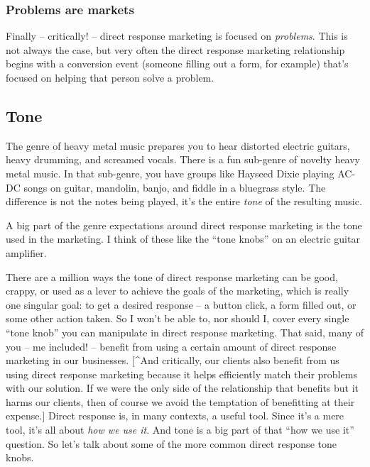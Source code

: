 \documentclass[13pt,]{tufte-handout}
\begin{document}
\hypertarget{problems-are-markets}{%
\subsubsection{Problems are markets}\label{problems-are-markets}}

Finally -- critically! -- direct response marketing is focused on
\emph{problems}. This is not always the case, but very often the direct
response marketing relationship begins with a conversion event (someone
filling out a form, for example) that's focused on helping that person
solve a problem.

\hypertarget{tone}{%
\subsection{Tone}\label{tone}}

The genre of heavy metal music prepares you to hear distorted electric
guitars, heavy drumming, and screamed vocals. There is a fun sub-genre
of novelty heavy metal music. In that sub-genre, you have groups like
Hayseed Dixie playing AC-DC songs on guitar, mandolin, banjo, and fiddle
in a bluegrass style. The difference is not the notes being played, it's
the entire \emph{tone} of the resulting music.

A big part of the genre expectations around direct response marketing is
the tone used in the marketing. I think of these like the ``tone knobs''
on an electric guitar amplifier.

There are a million ways the tone of direct response marketing can be
good, crappy, or used as a lever to achieve the goals of the marketing,
which is really one singular goal: to get a desired response -- a button
click, a form filled out, or some other action taken. So I won't be able
to, nor should I, cover every single ``tone knob'' you can manipulate in
direct response marketing. That said, many of you -- me included! --
benefit from using a certain amount of direct response marketing in our
businesses. {[}\^{}And critically, our clients also benefit from us
using direct response marketing because it helps efficiently match their
problems with our solution. If we were the only side of the relationship
that benefits but it harms our clients, then of course we avoid the
temptation of benefitting at their expense.{]} Direct response is, in
many contexts, a useful tool. Since it's a mere tool, it's all about
\emph{how we use it}. And tone is a big part of that ``how we use it''
question. So let's talk about some of the more common direct response
tone knobs.
\end{document}
